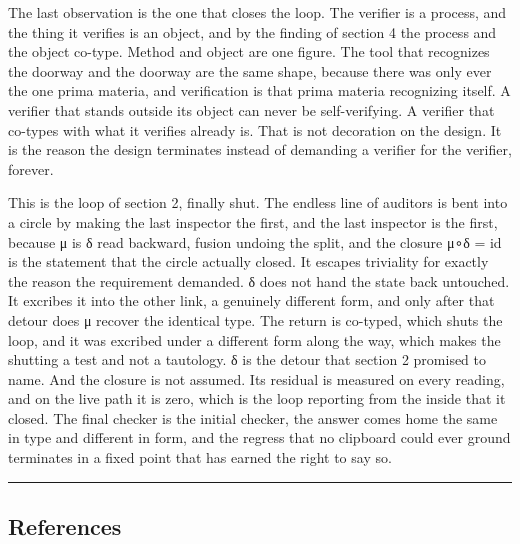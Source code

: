 \documentclass[12pt,a4paper]{article}
\begin{document}
The last observation is the one that closes the loop. The verifier is a
process, and the thing it verifies is an object, and by the finding of
section 4 the process and the object co-type. Method and object are one
figure. The tool that recognizes the doorway and the doorway are the
same shape, because there was only ever the one prima materia, and
verification is that prima materia recognizing itself. A verifier that
stands outside its object can never be self-verifying. A verifier that
co-types with what it verifies already is. That is not decoration on the
design. It is the reason the design terminates instead of demanding a
verifier for the verifier, forever.

This is the loop of section 2, finally shut. The endless line of
auditors is bent into a circle by making the last inspector the first,
and the last inspector is the first, because μ is δ read backward,
fusion undoing the split, and the closure μ∘δ = id is the statement that
the circle actually closed. It escapes triviality for exactly the reason
the requirement demanded. δ does not hand the state back untouched. It
excribes it into the other link, a genuinely different form, and only
after that detour does μ recover the identical type. The return is
co-typed, which shuts the loop, and it was excribed under a different
form along the way, which makes the shutting a test and not a tautology.
δ is the detour that section 2 promised to name. And the closure is not
assumed. Its residual is measured on every reading, and on the live path
it is zero, which is the loop reporting from the inside that it closed.
The final checker is the initial checker, the answer comes home the same
in type and different in form, and the regress that no clipboard could
ever ground terminates in a fixed point that has earned the right to say
so.

\begin{center}\rule{0.5\linewidth}{0.5pt}\end{center}

\hypertarget{references}{%
\subsection{References}\label{references}}
\end{document}
